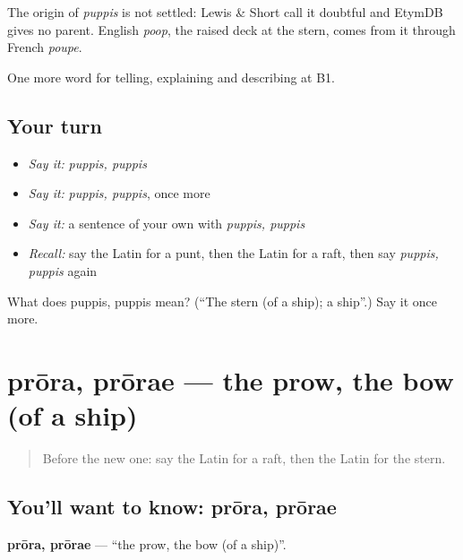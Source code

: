 \begin{cousinweb}
The origin of \emph{puppis} is not settled: Lewis \& Short call it doubtful and EtymDB gives no parent. English \emph{poop}, the raised deck at the stern, comes from it through French \emph{poupe}.
\end{cousinweb}

\begin{grammarlens}[title={What you've built}]
One more word for telling, explaining and describing at B1.
\end{grammarlens}

\subsection*{Your turn}
\begin{itemize}
\raggedright
  \item \emph{Say it:} \emph{puppis, puppis}
  \item \emph{Say it:} \emph{puppis, puppis}, once more
  \item \emph{Say it:} a sentence of your own with \emph{puppis, puppis}
  \item \emph{Recall:} say the Latin for a punt, then the Latin for a raft, then say \emph{puppis, puppis} again
\end{itemize}

\begin{tcolorbox}[breakable,colback=teal!4,colframe=teal!35!black,title={Before you move on}]
What does puppis, puppis mean? (\textquotedblleft{}The stern (of a ship); a ship\textquotedblright{}.) Say it once more.
\end{tcolorbox}
\section[prōra, prōrae]{prōra, prōrae — the prow, the bow (of a ship)}

\label{lesson:LA-C436-prora}



\begin{quote}
Before the new one: say the Latin for a raft, then the Latin for the stern.
\end{quote}

\subsection*{You'll want to know: prōra, prōrae}
\textbf{prōra, prōrae} — \textquotedblleft{}the prow, the bow (of a ship)\textquotedblright{}.

